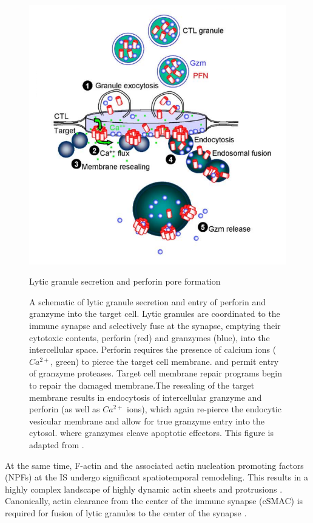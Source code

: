 \begin{figure}[htbp]
	\centering
	\includegraphics[width=\textwidth]{../figures/chapter1/degranulation.png}
	\caption{Lytic granule secretion and perforin pore formation}
	\caption*{A schematic of lytic granule secretion and entry of perforin and granzyme into the target cell. Lytic granules are coordinated to the immune synapse and selectively fuse at the synapse, emptying their cytotoxic contents, perforin (red) and granzymes (blue), into the intercellular space. Perforin requires the presence of calcium ions ($Ca^{2+}$, green) to pierce the target cell membrane. and permit entry of granzyme proteases. Target cell membrane repair programs begin to repair the damaged membrane.The resealing of the target membrane results in endocytosis of intercellular granzyme and perforin (as well as $Ca^{2+}$ ions), which again re-pierce the endocytic vesicular membrane and allow for true granzyme entry into the cytosol. where granzymes cleave apoptotic effectors. This figure is adapted from \cite{Keefe2005_2}.}
	\label{fig:degranulation}
\end{figure}

At the same time,  F-actin and the associated actin nucleation promoting factors (NPFs) at the IS undergo significant spatiotemporal remodeling.  This results in a highly complex landscape of highly dynamic actin sheets and protrusions \cite{Ritter2015}. Canonically, actin clearance from the center of the immune synapse (cSMAC) is required for fusion of lytic granules to the center of the synapse \cite{Ritter2015}. 

